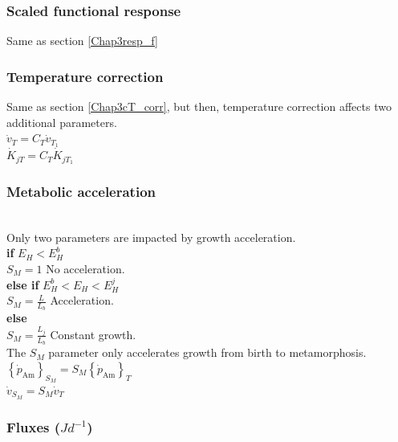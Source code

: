 \subsubsection{Scaled functional response}\label{Chap4resp_f}
Same as section \ref{Chap3resp_f}

\subsubsection{Temperature correction}\label{Chap4cT_corr}
Same as section \ref{Chap3cT_corr}, but then, temperature correction affects two additional parameters.\\

$\dot{v}_{T} = C_{T} \dot{v}_{T_{1}}$\\

$\dot{K}_{jT} = C_{T} \dot{K}_{jT_{1}}$\\

\subsubsection{Metabolic acceleration}\label{Chap4Acc}
\hfill \\

Only two parameters are impacted by growth acceleration.\\

\textbf{if}	$E_{H} < E_{H}^b$\\

$S_{M} = 1$ \hfill No acceleration.\\

\textbf{else if} $E_{H}^b < E_{H} < E_{H}^j$\\

$S_{M} = \frac{L}{L_{b}}$ \hfill Acceleration.\\

\textbf{else}\\

$S_{M} = \frac{L_{j}}{L_{b}}$ \hfill Constant growth.\\

The $S_{M}$ parameter only accelerates growth from birth to metamorphosis.\\

$\left \{ \dot{p}_\mathrm{Am} \right \}_{S_{M}} = S_{M} \left \{ \dot{p}_\mathrm{Am} \right \}_{T}$\\

$\dot{v}_{S_{M}} = S_{M} \dot{v}_{T}$\\

\subsubsection{Fluxes ($Jd^{-1}$)}\label{Chap4Fluxex}
\hfill \\

